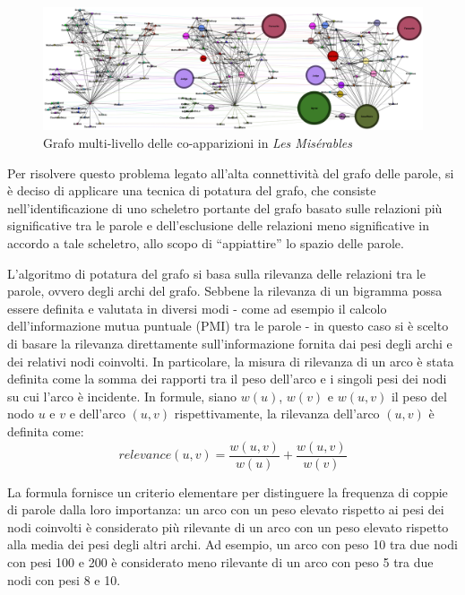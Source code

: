\begin{figure}[h]
    \centering
    \includegraphics[width=1\textwidth]{Immagini/les_miserables_example}
    \caption{Grafo multi-livello delle co-apparizioni in \textit{Les Misérables}}
    \label{fig:les-miserables-graph}
\end{figure}

Per risolvere questo problema legato all'alta connettività del grafo delle parole, si è deciso di applicare
una tecnica di potatura del grafo, che consiste nell'identificazione di uno scheletro portante del grafo
basato sulle relazioni più significative tra le parole e dell'esclusione delle relazioni meno significative in
accordo a tale scheletro, allo scopo di ``appiattire'' lo spazio delle parole.


L'algoritmo di potatura del grafo si basa sulla rilevanza delle relazioni tra le parole, ovvero degli archi del grafo.
Sebbene la rilevanza di un bigramma possa essere definita e valutata in diversi modi - come ad esempio il calcolo
dell'informazione mutua puntuale (PMI) tra le parole - in questo caso si è scelto di basare la rilevanza
direttamente sull'informazione fornita dai pesi degli archi e dei relativi nodi coinvolti.
In particolare, la misura di rilevanza di un arco è stata definita come la somma dei rapporti tra il peso dell'arco
e i singoli pesi dei nodi su cui l'arco è incidente.
In formule, siano $w(u)$, $w(v)$ e $w(u, v)$ il peso del nodo $u$ e $v$ e dell'arco $(u, v)$ rispettivamente,
la rilevanza dell'arco $(u, v)$ è definita come:
\begin{equation*}
    relevance(u, v) = \frac{w(u, v)}{w(u)} + \frac{w(u, v)}{w(v)}
\end{equation*}

La formula fornisce un criterio elementare per distinguere la frequenza di coppie di parole dalla loro importanza:
un arco con un peso elevato rispetto ai pesi dei nodi coinvolti è considerato più rilevante di un arco con un peso
elevato rispetto alla media dei pesi degli altri archi.
Ad esempio, un arco con peso 10 tra due nodi con pesi 100 e 200 è considerato meno rilevante di un arco con peso 5
tra due nodi con pesi 8 e 10. \newline

